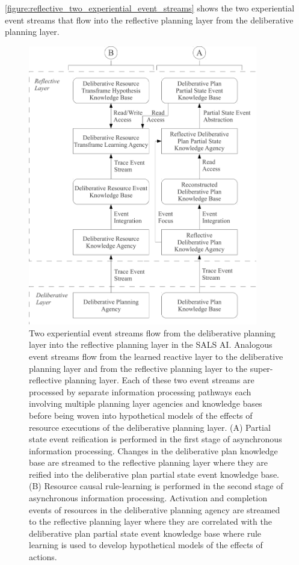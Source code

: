 {\mbox{\autoref{figure:reflective_two_experiential_event_streams}}}
shows the two experiential event streams that flow into the reflective
planning layer from the deliberative planning layer.
\begin{figure}
\centering
\includegraphics[width=10cm]{gfx/reflective_two_experiential_event_streams}
\caption[Two experiential event streams flow from the deliberative
  planning layer into the reflective planning layer in the SALS
  AI.]{Two experiential event streams flow from the deliberative
  planning layer into the reflective planning layer in the SALS AI.
  Analogous event streams flow from the learned reactive layer to the
  deliberative planning layer and from the reflective planning layer
  to the super-reflective planning layer.  Each of these two event
  streams are processed by separate information processing pathways
  each involving multiple planning layer agencies and knowledge bases
  before being woven into hypothetical models of the effects of
  resource executions of the deliberative planning layer.  (A) Partial
  state event reification is performed in the first stage of
  asynchronous information processing.  Changes in the deliberative
  plan knowledge base are streamed to the reflective planning layer
  where they are reified into the deliberative plan partial state
  event knowledge base.  (B) Resource causal rule-learning is
  performed in the second stage of asynchronous information
  processing.  Activation and completion events of resources in the
  deliberative planning agency are streamed to the reflective planning
  layer where they are correlated with the deliberative plan partial
  state event knowledge base where rule learning is used to develop
  hypothetical models of the effects of actions.}
\label{figure:reflective_two_experiential_event_streams}
\end{figure}
